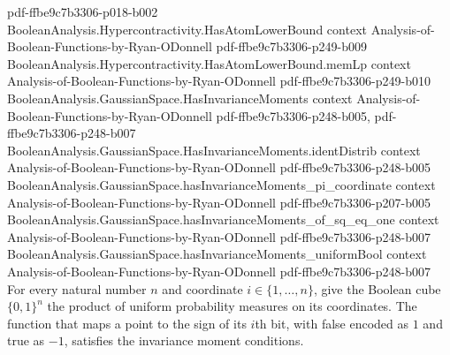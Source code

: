 \begin{lemma}
  {pdf-ffbe9c7b3306-p018-b002}
\proofstep
  {BooleanAnalysis.Hypercontractivity.HasAtomLowerBound}
  {context}
  {Analysis-of-Boolean-Functions-by-Ryan-ODonnell}
  {pdf-ffbe9c7b3306-p249-b009}
\proofstep
  {BooleanAnalysis.Hypercontractivity.HasAtomLowerBound.memLp}
  {context}
  {Analysis-of-Boolean-Functions-by-Ryan-ODonnell}
  {pdf-ffbe9c7b3306-p249-b010}
\proofstep
  {BooleanAnalysis.GaussianSpace.HasInvarianceMoments}
  {context}
  {Analysis-of-Boolean-Functions-by-Ryan-ODonnell}
  {pdf-ffbe9c7b3306-p248-b005,
    pdf-ffbe9c7b3306-p248-b007}
\proofstep
  {BooleanAnalysis.GaussianSpace.HasInvarianceMoments.identDistrib}
  {context}
  {Analysis-of-Boolean-Functions-by-Ryan-ODonnell}
  {pdf-ffbe9c7b3306-p248-b005}
\proofstep
  {BooleanAnalysis.GaussianSpace.hasInvarianceMoments_pi_coordinate}
  {context}
  {Analysis-of-Boolean-Functions-by-Ryan-ODonnell}
  {pdf-ffbe9c7b3306-p207-b005}
\proofstep
  {BooleanAnalysis.GaussianSpace.hasInvarianceMoments_of_sq_eq_one}
  {context}
  {Analysis-of-Boolean-Functions-by-Ryan-ODonnell}
  {pdf-ffbe9c7b3306-p248-b007}
\proofstep
  {BooleanAnalysis.GaussianSpace.hasInvarianceMoments_uniformBool}
  {context}
  {Analysis-of-Boolean-Functions-by-Ryan-ODonnell}
  {pdf-ffbe9c7b3306-p248-b007}
For every natural number $n$ and coordinate $i\in\{1,\ldots,n\}$, give the Boolean cube
$\{0,1\}^n$ the product of uniform probability measures on its coordinates. The function
that maps a point to the sign of its $i$th bit, with false encoded as $1$ and true as
$-1$, satisfies the invariance moment conditions.
\end{lemma}
